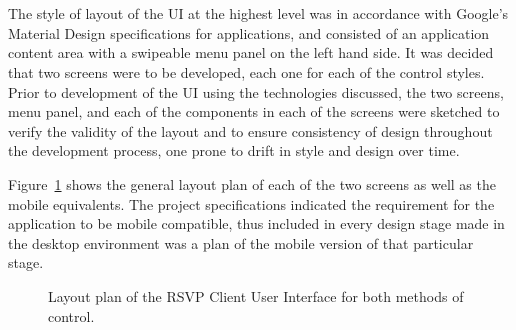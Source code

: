       \\\\
        The style of layout of the UI at the highest level was in accordance with Google's Material Design specifications for applications, and consisted of an application content area with a swipeable menu panel on the left hand side. It was decided that two screens were to be developed, each one for each of the control styles. Prior to development of the UI using the technologies discussed, the two screens, menu panel, and each of the components in each of the screens were sketched to verify the validity of the layout and to ensure consistency of design throughout the development process, one prone to drift in style and design over time.
        
        Figure~\ref{fig:softDesign-rsvpClientLayoutOverview} shows the general layout plan of each of the two screens as well as the mobile equivalents. The project specifications indicated the requirement for the application to be mobile compatible, thus included in every design stage made in the desktop environment was a plan of the mobile version of that particular stage.
        
        \begin{figure}[h!]
        \centering
         \qquad
        \caption[Layout plan of the RSVP Client User Interface for both methods of control.]{Layout plan of the RSVP Client User Interface for both methods of control.}
        \label{fig:softDesign-rsvpClientLayoutOverview}
        \end{figure}             
        
